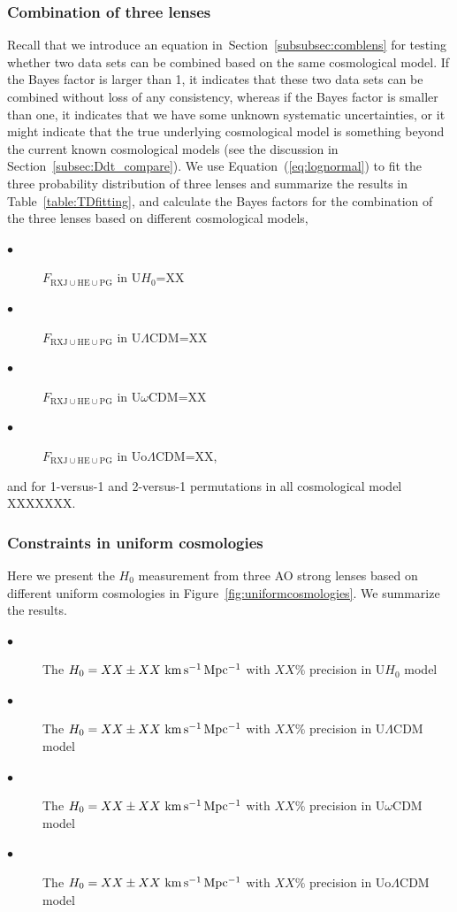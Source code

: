 \documentclass[useAMS,usenatbib]{mnras}
\newcommand{\sref}[1]{Section~\ref{#1}}
\newcommand{\fref}[1]{Figure~\ref{#1}}
\newcommand{\tref}[1]{Table~\ref{#1}}
\newcommand{\eref}[1]{Equation~(\ref{#1})}
\def\kmsmpc{\rm km\,s^{-1}\,Mpc^{-1}}
\begin{document}
\subsubsection{Combination of three lenses}
Recall that we introduce an equation in~\sref{subsubsec:comblens} for testing whether two data sets can be combined based on the same cosmological model. If the Bayes factor is larger than 1, it indicates that these two data sets can be combined without loss of any consistency, whereas if the Bayes factor is smaller than one, it indicates that we have some unknown systematic uncertainties, or it might indicate that the true underlying cosmological model is something beyond the current known cosmological models (see the discussion in \sref{subsec:Ddt_compare}).
We use \eref{eq:lognormal} to fit the three probability distribution of three lenses and summarize the results in \tref{table:TDfitting}, and calculate the Bayes factors for the combination of the three lenses based on different cosmological models,
\begin{description}
	\item[$\bullet$] $F_{\textrm{RXJ}\cup\textrm{HE}\cup\textrm{PG}}$ in U$H_{0}$=XX
    \item[$\bullet$] $F_{\textrm{RXJ}\cup\textrm{HE}\cup\textrm{PG}}$ in U$\Lambda$CDM=XX
    \item[$\bullet$] $F_{\textrm{RXJ}\cup\textrm{HE}\cup\textrm{PG}}$ in U$\omega$CDM=XX
    \item[$\bullet$] $F_{\textrm{RXJ}\cup\textrm{HE}\cup\textrm{PG}}$ in Uo$\Lambda$CDM=XX,
\end{description}
and for 1-versus-1 and 2-versus-1 permutations in all cosmological model XXXXXXX.

\subsubsection{Constraints in uniform cosmologies}
Here we present the $H_{0}$ measurement from three AO strong lenses based on different uniform cosmologies in \fref{fig:uniformcosmologies}. We summarize the results.
\begin{description}
	\item[$\bullet$] The $H_{0}=XX\pm XX~\kmsmpc$ with $XX\%$ precision in U$H_{0}$ model
    \item[$\bullet$] The $H_{0}=XX\pm XX~\kmsmpc$ with $XX\%$ precision in U$\Lambda$CDM model
    \item[$\bullet$] The $H_{0}=XX\pm XX~\kmsmpc$ with $XX\%$ precision in U$\omega$CDM model
    \item[$\bullet$] The $H_{0}=XX\pm XX~\kmsmpc$ with $XX\%$ precision in Uo$\Lambda$CDM model
\end{description}
\end{document}
